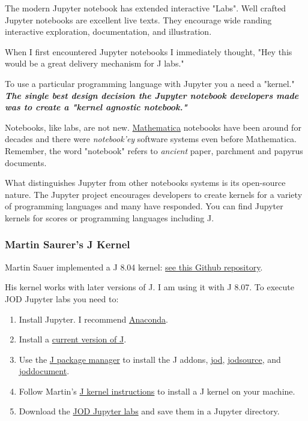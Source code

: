 \documentclass[11pt,letter,landscape]{article}
\begin{document}
The modern Jupyter notebook has extended interactive "Labs". Well
crafted Jupyter notebooks are excellent live texts. They encourage wide
randing interactive exploration, documentation, and illustration.

When I first encountered Jupyter notebooks I immediately thought, "Hey
this would be a great delivery mechanism for J labs."

To use a particular programming language with Jupyter you a need a
"kernel." \textbf{\emph{The single best design decision the Jupyter
notebook developers made was to create a "kernel agnostic notebook."}}

Notebooks, like labs, are not new.
\href{https://www.wolfram.com/mathematica/}{Mathematica} notebooks have
been around for decades and there were \emph{notebook'ey} software
systems even before Mathematica. Remember, the word "notebook" refers to
\emph{ancient} paper, parchment and papyrus documents.

What distinguishes Jupyter from other notebooks systems is its
open-source nature. The Jupyter project encourages developers to create
kernels for a variety of programming languages and many have responded.
You can find Jupyter kernels for scores or programming languages
including J.

    \subsubsection{Martin Saurer's J Kernel}\label{martin-saurers-j-kernel}

Martin Sauer implemented a J 8.04 kernel:
\href{https://github.com/martin-saurer/jkernel}{see this Github
repository}.

His kernel works with later versions of J. I am using it with J 8.07. To
execute JOD Jupyter labs you need to:

\begin{enumerate}
\def\labelenumi{\arabic{enumi}.}
\item
  Install Jupyter. I recommend
  \href{https://www.anaconda.com/download/}{Anaconda}.
\item
  Install a
  \href{https://code.jsoftware.com/wiki/System/Installation}{current
  version of J}.
\item
  Use the \href{https://code.jsoftware.com/wiki/JAL/User_Guide}{J
  package manager} to install the J addons,
  \href{https://code.jsoftware.com/wiki/Addons/general/jod}{jod},
  \href{https://code.jsoftware.com/wiki/Addons/general/jodsource}{jodsource},
  and
  \href{https://code.jsoftware.com/wiki/Addons/general/joddocument}{joddocument}.
\item
  Follow Martin's
  \href{https://github.com/martin-saurer/jkernel/blob/master/README.md}{J
  kernel instructions} to install a J kernel on your machine.
\item
  Download the
  \href{https://github.com/bakerjd99/jod/tree/master/jodnotebooks}{JOD
  Jupyter labs} and save them in a Jupyter directory.
\end{enumerate}
\end{document}

